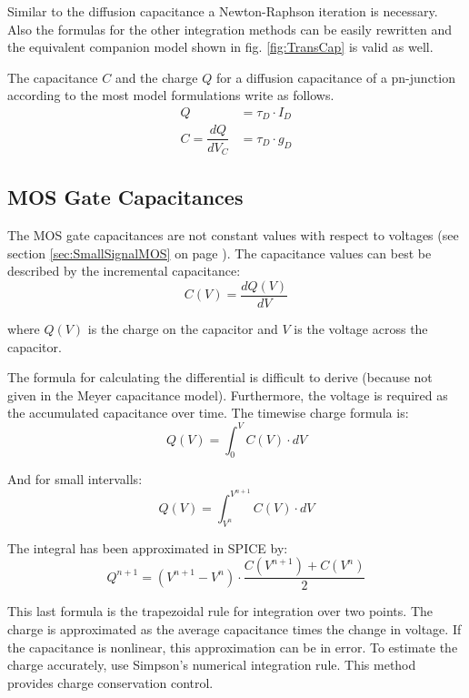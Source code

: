 Similar to the diffusion capacitance a Newton-Raphson iteration is
necessary.  Also the formulas for the other integration methods can be
easily rewritten and the equivalent companion model shown in
fig. \ref{fig:TransCap} is valid as well.

\addvspace{12pt}

The capacitance $C$ and the charge $Q$ for a diffusion capacitance of
a pn-junction according to the most model formulations write as
follows.
\begin{align}
Q &= \tau_D\cdot I_D\\
C = \dfrac{d Q}{d V_C} &= \tau_D\cdot g_D
\end{align}

\subsection{MOS Gate Capacitances}

The MOS gate capacitances are not constant values with respect to
voltages (see section \ref{sec:SmallSignalMOS} on page
\pageref{sec:SmallSignalMOS}). The capacitance values can best be
described by the incremental capacitance:
\begin{equation}
C(V) = \dfrac{d Q(V)}{d V}
\end{equation}

where $Q(V)$ is the charge on the capacitor and $V$ is the voltage
across the capacitor.

\addvspace{12pt}

The formula for calculating the differential is difficult to derive
(because not given in the Meyer capacitance model).  Furthermore, the
voltage is required as the accumulated capacitance over time.  The
timewise charge formula is:
\begin{equation}
Q(V) = \int^{V}_{0} C(V)\cdot dV
\end{equation}

And for small intervalls:
\begin{equation}
Q(V) = \int^{V^{n+1}}_{V^{n}} C(V)\cdot dV
\end{equation}

The integral has been approximated in SPICE by:
\begin{equation}
Q^{n+1} = \left(V^{n+1} - V^{n}\right)\cdot \dfrac{C(V^{n+1}) + C(V^{n})}{2}
\end{equation}

This last formula is the trapezoidal rule for integration over two
points.  The charge is approximated as the average capacitance times
the change in voltage.  If the capacitance is nonlinear, this
approximation can be in error.  To estimate the charge accurately, use
Simpson's numerical integration rule.  This method provides charge
conservation control.

